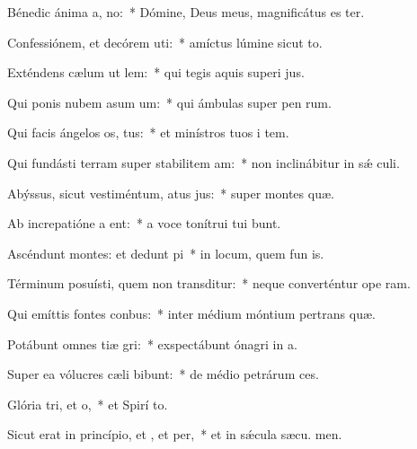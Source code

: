 \item Bénedic ánima a, no:~* Dómine, Deus meus, magnificátus es ter.
\item Confessiónem, et decórem uti:~* amíctus lúmine sicut to.
\item Exténdens cælum ut lem:~* qui tegis aquis superi jus.
\item Qui ponis nubem asum um:~* qui ámbulas super pen rum.
\item Qui facis ángelos os, tus:~* et minístros tuos i tem.
\item Qui fundásti terram super stabilitem am:~* non inclinábitur in sǽ culi.
\item Abýssus, sicut vestiméntum, atus jus:~* super montes  quæ.
\item Ab increpatióne a ent:~* a voce tonítrui tui bunt.
\item Ascéndunt montes: et dedunt pi~* in locum, quem fun is.
\item Términum posuísti, quem non transditur:~* neque converténtur ope ram.
\item Qui emíttis fontes  conbus:~* inter médium móntium pertrans quæ.
\item Potábunt omnes tiæ gri:~* exspectábunt ónagri in  a.
\item Super ea vólucres cæli bibunt:~* de médio petrárum  ces.
\item Glória tri, et o,~* et Spirí to.
\item Sicut erat in princípio, et , et per,~* et in sǽcula sæcu. men.
